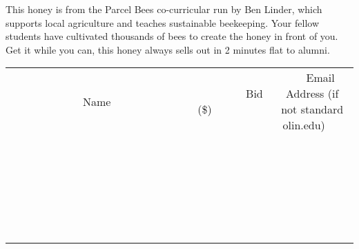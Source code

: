 \documentclass[11pt]{article}
\begin{document}
This honey is from the Parcel Bees co-curricular run by Ben Linder, which supports local agriculture and teaches sustainable beekeeping. Your fellow students have cultivated thousands of bees to create the honey in front of you. Get it while you can, this honey always sells out in 2 minutes flat to alumni.
\\[6ex]
\begin{tabular}{c c c}
~~~~~~~~~~~~~Name~~~~~~~~~~~~~ & ~~~~~~~~~Bid (\$)~~~~~~~~~  & ~~~Email Address (if not standard olin.edu)~~~\\
 & & \\
\hline
 & & \\
\hline
 & & \\
\hline
 & & \\
\hline
 & & \\
\hline
 & & \\
\hline
 & & \\
\hline
 & & \\
\hline
 & & \\
\hline
 & & \\
\hline
 & & \\
\hline
 & & \\
\hline
 & & \\
\hline
 & & \\
\hline
 & & \\
\hline
 & & \\
\hline
 & & \\
\hline
 & & \\
\hline
 & & \\
\hline
 & & \\
\hline
 & & \\
\hline
 & & \\
\hline
 & & \\
\hline
 & & \\
\hline
 & & \\
\hline
 & & \\
\hline
\end{tabular}
\newpage
\end{document}

